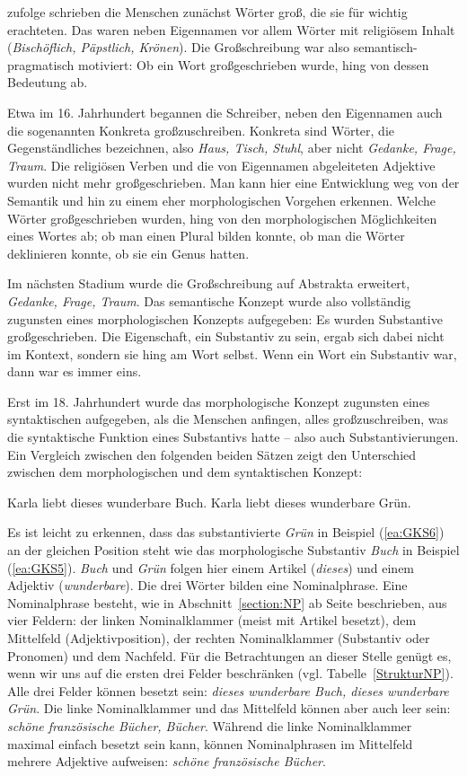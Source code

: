 \citet[153]{Bredel2006} zufolge schrieben die Menschen zunächst Wörter groß, die sie für wichtig erachteten. Das waren neben Eigennamen vor allem Wörter mit religiösem Inhalt (\textit{Bischöflich, Päpstlich, Krönen}). Die Großschreibung war also semantisch-pragmatisch motiviert: Ob ein Wort großgeschrieben wurde, hing von dessen Bedeutung ab.

Etwa im 16. Jahrhundert begannen die Schreiber, neben den Eigennamen auch die sogenannten Konkreta großzuschreiben. Konkreta sind Wörter, die Gegenständliches bezeichnen, also \textit{Haus, Tisch, Stuhl}, aber nicht \textit{Gedanke, Frage, Traum}. Die religiösen Verben und die von Eigennamen abgeleiteten Adjektive wurden nicht mehr großgeschrieben. Man kann hier eine Entwicklung weg von der Semantik und hin zu einem eher morphologischen Vorgehen erkennen. Welche Wörter großgeschrieben wurden, hing von den morphologischen Möglichkeiten eines Wortes ab; ob man \zB einen Plural bilden konnte, ob man die Wörter deklinieren konnte, ob sie ein Genus hatten.

Im nächsten Stadium wurde die Großschreibung auf Abstrakta erweitert, \zB \textit{Gedanke, Frage, Traum}. Das semantische Konzept wurde also vollständig zugunsten eines morphologischen Konzepts aufgegeben: Es wurden Substantive großgeschrieben. Die Eigenschaft, ein Substantiv zu sein, ergab sich dabei nicht im Kontext, sondern sie hing am Wort selbst. Wenn ein Wort ein Substantiv war, dann war es immer eins.

Erst im 18. Jahrhundert wurde das morphologische Konzept zugunsten eines syntaktischen aufgegeben, als die Menschen anfingen, alles großzuschreiben, was die syntaktische Funktion eines Substantivs hatte -- also auch Substantivierungen. Ein Vergleich zwischen den folgenden beiden Sätzen zeigt den Unterschied zwischen dem morphologischen und dem syntaktischen Konzept:

\ea \label{GKSBB}
\ea \label{ea:GKS5} Karla liebt dieses wunderbare Buch.
\ex \label{ea:GKS6} Karla liebt dieses wunderbare Grün.
\z
\z

Es ist leicht zu erkennen, dass das substantivierte \textit{Grün} in Beispiel (\ref{ea:GKS6}) an der gleichen Position steht wie das morphologische Substantiv \textit{Buch} in Beispiel (\ref{ea:GKS5}). \textit{Buch} und \textit{Grün} folgen hier einem Artikel (\textit{dieses}) und einem Adjektiv (\textit{wunderbare}). Die drei Wörter bilden eine Nominalphrase. Eine Nominalphrase besteht, wie in Abschnitt~\ref{section:NP} ab Seite \pageref{section:NP} beschrieben, aus vier Feldern: der linken Nominalklammer (meist mit Artikel besetzt), dem Mittelfeld (Adjektivposition), der rechten Nominalklammer (Substantiv oder Pronomen) und dem Nachfeld. Für die Betrachtungen an dieser Stelle genügt es, wenn wir uns auf die ersten drei Felder beschränken (vgl. Tabelle~\ref{StrukturNP}). Alle drei Felder können besetzt sein: \textit{dieses wunderbare Buch, dieses wunderbare Grün}. Die linke Nominalklammer und das Mittelfeld können aber auch leer sein: \textit{schöne französische Bücher, Bücher}. Während die linke Nominalklammer maximal einfach besetzt sein kann, können Nominalphrasen im Mittelfeld mehrere Adjektive aufweisen: \textit{schöne französische Bücher}.

